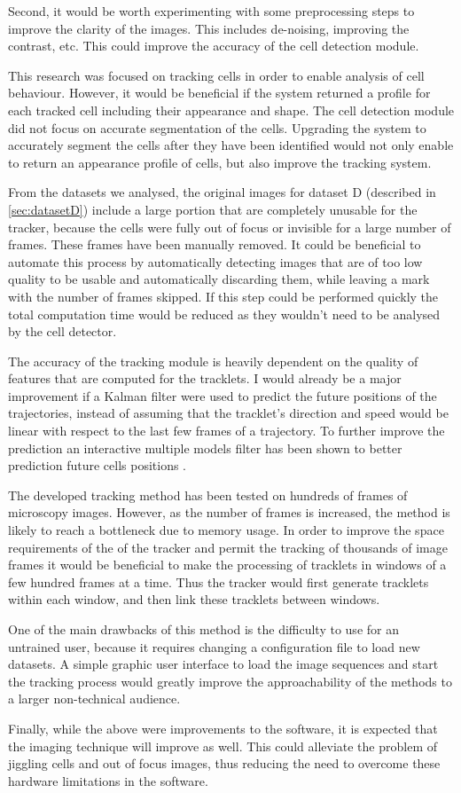 Second, it would be worth experimenting with some preprocessing steps to improve the clarity of the images. This includes de-noising, improving the contrast, etc. This could improve the accuracy of the cell detection module.

This research was focused on tracking cells in order to enable analysis of cell behaviour. However, it would be beneficial if the system returned a profile for each tracked cell including their appearance and shape. The cell detection module did not focus on accurate segmentation of the cells. Upgrading the system to accurately segment the cells after they have been identified would not only enable to return an appearance profile of cells, but also improve the tracking system. 

From the datasets we analysed, the original images for dataset D (described in \cref{sec:datasetD}) include a large portion that are completely unusable for the tracker, because the cells were fully out of focus or invisible for a large number of frames. These frames have been manually removed. It could be beneficial to automate this process by automatically detecting images that are of too low quality to be usable and automatically discarding them, while leaving a mark with the number of frames skipped. If this step could be performed quickly the total computation time would be reduced as they wouldn't need to be analysed by the cell detector.

The accuracy of the tracking module is heavily dependent on the quality of features that are computed for the tracklets. I would already be a major improvement if a Kalman filter were used to predict the future positions of the trajectories, instead of assuming that the tracklet's direction and speed would be linear with respect to the last few frames of a trajectory. To further improve the prediction an interactive multiple models filter has been shown to better prediction future cells positions \cite{li08}.

The developed tracking method has been tested on hundreds of frames of microscopy images. However, as the number of frames is increased, the method is likely to reach a bottleneck due to memory usage. In order to improve the space requirements of the of the tracker and permit the tracking of thousands of image frames it would be beneficial to make the processing of tracklets in windows of a few hundred frames at a time. Thus the tracker would first generate tracklets within each window, and then link these tracklets between windows. 

One of the main drawbacks of this method is the difficulty to use for an untrained user, because it requires changing a configuration file to load new datasets. A simple graphic user interface to load the image sequences and start the tracking process would greatly improve the approachability of the methods to a larger non-technical audience.

Finally, while the above were improvements to the software, it is expected that the imaging technique will improve as well. This could alleviate the problem of jiggling cells and out of focus images, thus reducing the need to overcome these hardware limitations in the software.